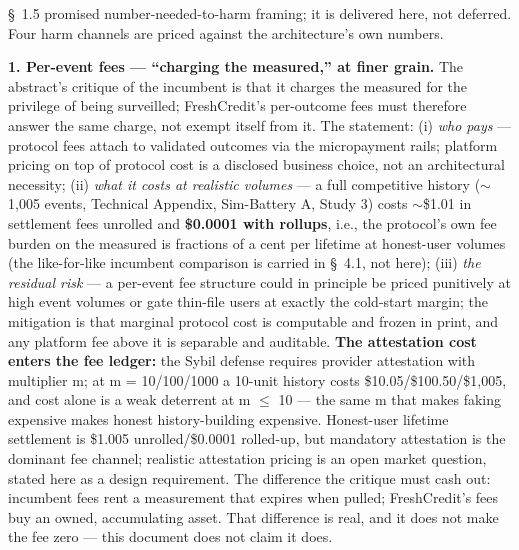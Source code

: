 \documentclass[
]{article}
\begin{document}
§~1.5 promised number-needed-to-harm framing; it is delivered here, not
deferred. Four harm channels are priced against the architecture's own
numbers.

\textbf{1. Per-event fees --- ``charging the measured,'' at finer
grain.} The abstract's critique of the incumbent is that it charges the
measured for the privilege of being surveilled; FreshCredit's
per-outcome fees must therefore answer the same charge, not exempt
itself from it. The statement: (i) \emph{who pays} --- protocol fees
attach to validated outcomes via the micropayment rails; platform
pricing on top of protocol cost is a disclosed business choice, not an
architectural necessity; (ii) \emph{what it costs at realistic volumes}
--- a full competitive history (\(\sim\)1,005 events, Technical
Appendix, Sim-Battery A, Study 3) costs \(\sim\)\$1.01 in settlement
fees unrolled and \textbf{\$0.0001 with rollups}, i.e., the protocol's
own fee burden on the measured is fractions of a cent per lifetime at
honest-user volumes (the like-for-like incumbent comparison is carried
in §~4.1, not here); (iii) \emph{the residual risk} --- a per-event fee
structure could in principle be priced punitively at high event volumes
or gate thin-file users at exactly the cold-start margin; the mitigation
is that marginal protocol cost is computable and frozen in print, and
any platform fee above it is separable and auditable. \textbf{The
attestation cost enters the fee ledger:} the Sybil defense requires
provider attestation with multiplier m; at m = 10/100/1000 a 10-unit
history costs \$10.05/\$100.50/\$1,005, and cost alone is a weak
deterrent at m \(\leq\) 10 --- the same m that makes faking expensive
makes honest history-building expensive. Honest-user lifetime settlement
is \$1.005 unrolled/\$0.0001 rolled-up, but mandatory attestation is the
dominant fee channel; realistic attestation pricing is an open market
question, stated here as a design requirement. The difference the
critique must cash out: incumbent fees rent a measurement that expires
when pulled; FreshCredit's fees buy an owned, accumulating asset. That
difference is real, and it does not make the fee zero --- this document
does not claim it does.
\end{document}
